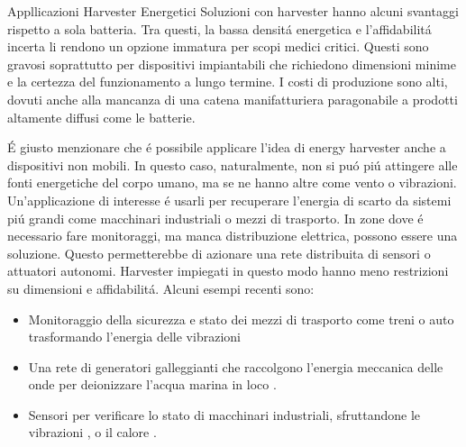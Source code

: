 \begin{section}{Appllicazioni Harvester Energetici}
    Soluzioni con harvester hanno alcuni svantaggi rispetto a sola batteria. Tra questi, la bassa densit\'a energetica e l'affidabilit\'a incerta li rendono un opzione immatura per scopi medici critici. Questi sono gravosi soprattutto per dispositivi impiantabili che richiedono dimensioni minime e la certezza del funzionamento a lungo termine. I costi di produzione sono alti, dovuti anche alla mancanza di una catena manifatturiera paragonabile a prodotti altamente diffusi come le batterie.

    \'E giusto menzionare che \'e possibile applicare l'idea di energy harvester anche a dispositivi non mobili. In questo caso, naturalmente, non si pu\'o pi\'u attingere alle fonti energetiche del corpo umano, ma se ne hanno altre come vento o vibrazioni. Un'applicazione di interesse \'e usarli per recuperare l'energia di scarto da sistemi pi\'u grandi come macchinari industriali o mezzi di trasporto. In zone dove \'e necessario fare monitoraggi, ma manca distribuzione elettrica, possono essere una soluzione. Questo permetterebbe di azionare una rete distribuita di sensori o attuatori autonomi. Harvester impiegati in questo modo hanno meno restrizioni su dimensioni e affidabilit\'a. Alcuni esempi recenti sono: \begin{itemize}
        \item Monitoraggio della sicurezza e stato dei mezzi di trasporto come treni o auto trasformando l'energia delle vibrazioni \cite{liSmartRailwayTransportation, liuCompactHybridizedTriboelectricelectromagnetic2024}
        \item Una rete di generatori galleggianti che raccolgono l'energia meccanica delle onde per deionizzare l'acqua marina in loco \cite{renWavepoweredCapacitiveDeionization2024}. 
        \item Sensori per verificare lo stato di macchinari industriali, sfruttandone le vibrazioni \cite{alvarezruedaVibrationEnergyHarvesting2024, gaoHybridGeneratorEfficient2024}, o il calore \cite{deoliveiraDevelopmentHybridEnergy2024}.
    \end{itemize}
    
\end{section}
